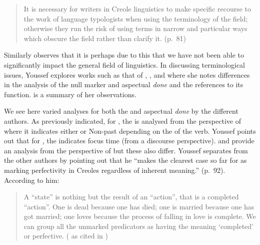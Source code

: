 \begin{quote}
It is necessary for writers in Creole linguistics to make specific
recourse to the work of language typologists when using the
terminology of the field; otherwise they run the risk of using terms
in narrow and particular ways which obscure the field rather than
clarify it. (p.~81)\end{quote}

Similarly \citet{Winford1993,Winford1997,Winford2001} observes that it
is perhaps due to this that we have not been able to significantly
impact the general field of linguistics.  In discussing terminological
issues, Youssef explores works such as that of \citet{Bickerton1975},
\citet{Holm1988}, \citet{Solomon1993} and \citet{Winford1993} where
she notes differences in the analysis of the null 
marker and aspectual \textit{done} and the references to its function.
 is a summary of her observations.

We see here varied analyses for both the  and aspectual
\textit{done} by the different authors.  As previously indicated, for
\citet{Bickerton1975}, the  is analysed from the
perspective of  where it indicates either  or Non-past
depending on the  of the verb.  Youssef points out that for
\citet{Holm1988}, the  indicates focus time (from a
discourse perspective).  \citet{Solomon1993} and \citet{Winford1993}
provide an analysis from the perspective of  but these also
differ.  Youssef separates \citet{Solomon1993} from the other authors
by pointing out that he ``makes the clearest case so far for \NULL as
marking perfectivity in Creoles regardless of inherent meaning.”
(p.~92).  According to him:

\begin{quote}
A ``state'' is nothing but the result of an ``action'', that is a
completed ``action''.  One is dead because one has died; one is married
because one has got married; one loves because the process of falling
in love is complete. We can group all the unmarked predicators as
having the meaning `completed' or perfective. (\citealt[96]{Solomon1993}
as cited in \citealt[92]{Youssef2003})
\end{quote}

